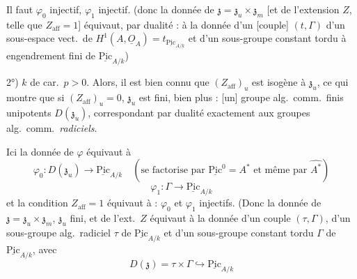 \documentclass[11pt,a4paper]{article}
\begin{document}

Il faut $\varphi_{0}$ injectif, $\varphi_{1}$ injectif. (donc la donnée de $\mathfrak{z} = \mathfrak{z}_{u} \times \mathfrak{z}_{m}$ [et de l'extension $Z$, telle que $Z_{\mathrm{aff}} = 1$] équivaut, par dualité : à la donnée d'un [couple]  $(t, \Gamma)$ d'un sous-espace vect.\ de $H^{1}(A, \underline{O}_{A}) = t_{\underline{\mathrm{Pic}}_{A/k}}$ et d'un sous-groupe constant tordu   à engendrement fini de $\underline{\mathrm{Pic}}_{A/k}$)

2°) $k$ de car.\ $p > 0$. Alors,  il est bien connu que $(Z_{\mathrm{aff}})_{u}$  est isogène à $\mathfrak{z}_{u}$, ce qui montre que si $(Z_{\mathrm{aff}})_{u} = 0$, $\mathfrak{z}_{u}$ est fini, bien plus : \ill{} \ill{} [un] groupe alg.\ comm.\ finis unipotents $D(\mathfrak{z}_{u})$,  correspondant par dualité exactement aux groupes alg.\ comm.\ \emph{radiciels}. 

Ici la donnée de $\varphi$ équivaut à
\[
  \varphi_{0} \colon D(\mathfrak{z}_{u}) \longrightarrow \underline{\mathrm{Pic}}_{A/k}
  \quad (\text{se factorise par } \underline{\mathrm{Pic}}^{0} = A^{*} \text{ et même par } \widehat{A^{*}})
\]
\[
  \varphi_{1} \colon \Gamma \longrightarrow \underline{\mathrm{Pic}}_{A/k}
\]
et la condition $Z_{\mathrm{aff}} = 1$ équivaut à : $\varphi_{0}$ et $\varphi_{1}$ injectifs.
(Donc la donnée de $\mathfrak{z} = \mathfrak{z}_{u} \times \mathfrak{z}_{m}$, $\mathfrak{z}_{u}$ fini, et de l'ext.\ $Z$ équivaut à la donnée d'un couple $(\tau, \Gamma)$, d'un sous-groupe alg.\ radiciel $\tau$ de $\underline{\mathrm{Pic}}_{A/k}$ et d'un sous-groupe constant tordu $\Gamma$ de $\underline{\mathrm{Pic}}_{A/k}$,  avec
\[
  D(\mathfrak{z}) = \tau \times \Gamma \hookrightarrow \underline{\mathrm{Pic}}_{A/k}
\]
\end{document}
